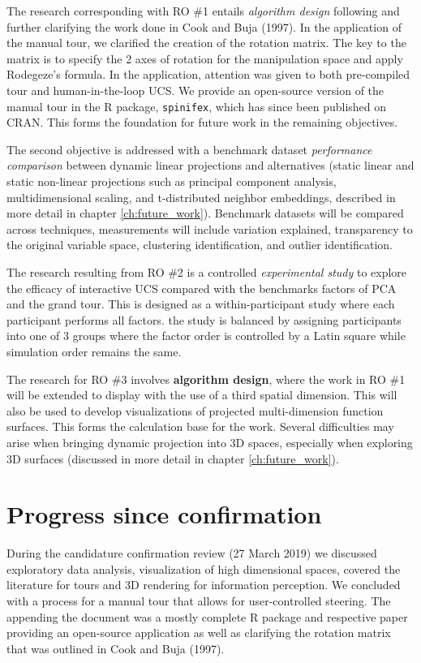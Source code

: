 \documentclass[11,]{article}
\theoremstyle{definition}
\theoremstyle{definition}
\theoremstyle{definition}
\theoremstyle{remark}
\begin{document}
The research corresponding with RO \#1 entails \emph{algorithm design}
following and further clarifying the work done in Cook and Buja (1997).
In the application of the manual tour, we clarified the creation of the
rotation matrix. The key to the matrix is to specify the 2 axes of
rotation for the manipulation space and apply Rodegeze's formula. In the
application, attention was given to both pre-compiled tour and
human-in-the-loop UCS. We provide an open-source version of the manual
tour in the R package, \texttt{spinifex}, which has since been published
on CRAN. This forms the foundation for future work in the remaining
objectives.

The second objective is addressed with a benchmark dataset
\emph{performance comparison} between dynamic linear projections and
alternatives (static linear and static non-linear projections such as
principal component analysis, multidimensional scaling, and
t-distributed neighbor embeddings, described in more detail in chapter
\ref{ch:future_work}). Benchmark datasets will be compared across
techniques, measurements will include variation explained, transparency
to the original variable space, clustering identification, and outlier
identification.

The research resulting from RO \#2 is a controlled \emph{experimental
study} to explore the efficacy of interactive UCS compared with the
benchmarks factors of PCA and the grand tour. This is designed as a
within-participant study where each participant performs all factors.
the study is balanced by assigning participants into one of 3 groups
where the factor order is controlled by a Latin square while simulation
order remains the same.

The research for RO \#3 involves \textbf{algorithm design}, where the
work in RO \#1 will be extended to display with the use of a third
spatial dimension. This will also be used to develop visualizations of
projected multi-dimension function surfaces. This forms the calculation
base for the work. Several difficulties may arise when bringing dynamic
projection into 3D spaces, especially when exploring 3D surfaces
(discussed in more detail in chapter \ref{ch:future_work}).

\section{Progress since confirmation}\label{progress-since-confirmation}

During the candidature confirmation review (27 March 2019) we discussed
exploratory data analysis, visualization of high dimensional spaces,
covered the literature for tours and 3D rendering for information
perception. We concluded with a process for a manual tour that allows
for user-controlled steering. The appending the document was a mostly
complete R package and respective paper providing an open-source
application as well as clarifying the rotation matrix that was outlined
in Cook and Buja (1997).
\end{document}
